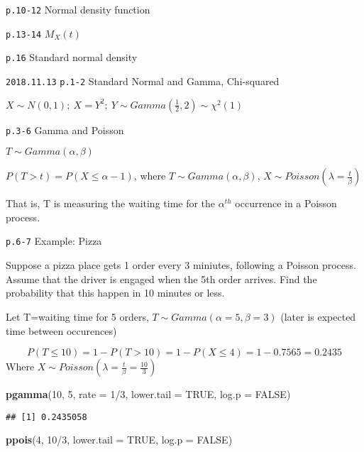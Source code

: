 \documentclass[]{tufte-book}
\newenvironment{Shaded}{}{}
\newcommand{\DataTypeTok}[1]{\textcolor[rgb]{0.56,0.13,0.00}{#1}}
\newcommand{\DecValTok}[1]{\textcolor[rgb]{0.25,0.63,0.44}{#1}}
\newcommand{\KeywordTok}[1]{\textcolor[rgb]{0.00,0.44,0.13}{\textbf{#1}}}
\newcommand{\NormalTok}[1]{#1}
\newcommand{\OperatorTok}[1]{\textcolor[rgb]{0.40,0.40,0.40}{#1}}
\newcommand{\OtherTok}[1]{\textcolor[rgb]{0.00,0.44,0.13}{#1}}
\begin{document}
\texttt{p.10-12} Normal density function

\texttt{p.13-14} \(M_X(t)\)

\texttt{p.16} Standard normal density

\texttt{2018.11.13} \texttt{p.1-2} Standard Normal and Gamma,
Chi-squared

\(X\sim N(0,1);\ X=Y^2;\ Y\sim Gamma(\frac12,2)\sim\chi^2(1)\)

\texttt{p.3-6} Gamma and Poisson

\(T\sim Gamma(\alpha,\beta)\)

\(P(T>t)=P(X\le\alpha-1)\), where \(T\sim Gamma(\alpha,\beta)\),
\(X\sim Poisson(\lambda=\frac{t}\beta)\)

That is, T is measuring the waiting time for the \(\alpha^{th}\)
occurrence in a Poisson process.

\texttt{p.6-7} Example: Pizza

Suppose a pizza place gets 1 order every 3 miniutes, following a Poisson
process. Assume that the driver is engaged when the 5th order arrives.
Find the probability that this happen in 10 minutes or less.

Let T=waiting time for 5 orders, \(T\sim Gamma(\alpha=5,\beta=3)\)
(later is expected time between occurences)

\[P(T\le10)=1-P(T>10)=1-P(X\le4)=1-0.7565=0.2435\] Where
\(X\sim Poisson(\lambda=\frac{t}\beta=\frac{10}3)\)

\begin{Shaded}
\begin{Highlighting}[]
\KeywordTok{pgamma}\NormalTok{(}\DecValTok{10}\NormalTok{, }\DecValTok{5}\NormalTok{, }\DataTypeTok{rate =} \DecValTok{1}\OperatorTok{/}\DecValTok{3}\NormalTok{, }\DataTypeTok{lower.tail =} \OtherTok{TRUE}\NormalTok{, }\DataTypeTok{log.p =} \OtherTok{FALSE}\NormalTok{)}
\end{Highlighting}
\end{Shaded}

\begin{verbatim}
## [1] 0.2435058
\end{verbatim}

\begin{Shaded}
\begin{Highlighting}[]
\KeywordTok{ppois}\NormalTok{(}\DecValTok{4}\NormalTok{, }\DecValTok{10}\OperatorTok{/}\DecValTok{3}\NormalTok{, }\DataTypeTok{lower.tail =} \OtherTok{TRUE}\NormalTok{, }\DataTypeTok{log.p =} \OtherTok{FALSE}\NormalTok{)}
\end{Highlighting}
\end{Shaded}
\end{document}
